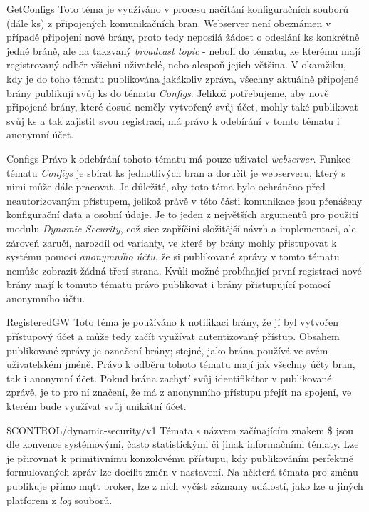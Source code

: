 \def\myprefix{}
\begin{enumnonum}[style=nextline]
    \item[GetConfigs]
    Toto téma je využíváno v procesu načítání konfiguračních souborů (dále \acrshort{ks}) z připojených komunikačních bran. Webserver není obeznámen v případě připojení nové brány, proto tedy neposílá žádost o odeslání \acrshort{ks} konkrétně jedné bráně, ale na takzvaný \emph{broadcast topic} - neboli do tématu, ke kterému mají registrovaný odběr všichni uživatelé, nebo alespoň jejich většina. V okamžiku, kdy je do toho tématu publikována jakákoliv zpráva, všechny aktuálně připojené brány publikují svůj \acrshort{ks} do tématu \emph{Configs}. Jelikož potřebujeme, aby nově připojené brány, které dosud neměly vytvořený svůj účet, mohly také publikovat svůj \acrshort{ks} a tak zajistit svou registraci, má právo k odebírání v tomto tématu i anonymní účet.
    \item[Configs]
    Právo k odebírání tohoto tématu má pouze uživatel \emph{webserver}. Funkce tématu \emph{Configs} je sbírat \acrshort{ks} jednotlivých bran a doručit je webserveru, který s nimi může dále pracovat. Je důležité, aby toto téma bylo ochráněno před neautorizovaným přístupem, jelikož právě v této části komunikace jsou přenášeny konfigurační data a osobní údaje. Je to jeden z největších argumentů pro použití modulu \emph{Dynamic Security}, což sice zapříčiní složitější návrh a implementaci, ale zároveň zaručí, narozdíl od varianty, ve které by brány mohly přistupovat k systému pomocí \emph{anonymního účtu}, že si publikované zprávy v tomto tématu nemůže zobrazit žádná třetí strana. Kvůli možné probíhající první registraci nové brány mají k tomuto tématu právo publikovat i brány přistupující pomocí anonymního účtu.
    \item[RegisteredGW]
    Toto téma je používáno k notifikaci brány, že jí byl vytvořen přístupový účet a může tedy začít využívat autentizovaný přístup. Obsahem publikované zprávy je označení brány; stejné, jako brána používá ve svém uživatelském jméně. Právo k odběru tohoto tématu mají jak všechny účty bran, tak i anonymní účet. Pokud brána zachytí svůj identifikátor v publikované zprávě, je to pro ní značení, že má z anonymního přístupu přejít na spojení, ve kterém bude využívat svůj unikátní účet.
    \item[\$CONTROL/dynamic-security/v1]
    Témata s názvem začínajícím znakem \$ jsou dle konvence systémovými, často statistickými či jinak informačními tématy. Lze je přirovnat k primitivnímu konzolovému přístupu, kdy publikováním perfektně formulovaných zpráv lze docílit změn v nastavení. Na některá témata pro změnu publikuje přímo \acrshort{mqtt} broker, lze z nich vyčíst záznamy událostí, jako lze u jiných platforem z \emph{log} souborů.
\end{enumnonum}

